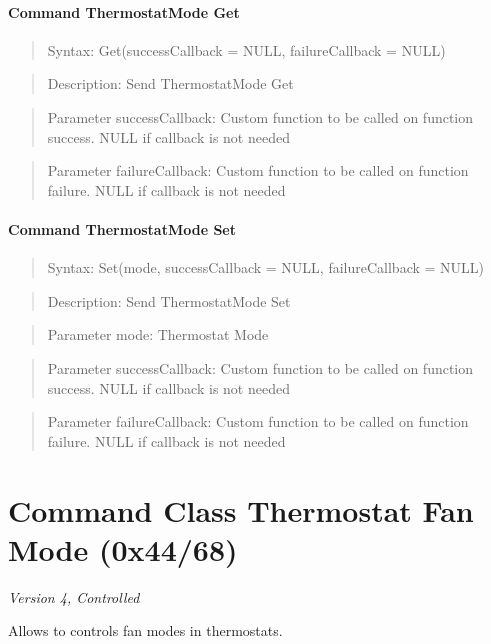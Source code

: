 \paragraph{Command ThermostatMode Get}
\begin{quote}Syntax: Get(successCallback = NULL, failureCallback = NULL)\end{quote}
\begin{quote}Description: Send ThermostatMode Get\end{quote}
\begin{quote}Parameter successCallback: Custom function to be called on function success. NULL if callback is not needed\end{quote}
\begin{quote}Parameter failureCallback: Custom function to be called on function failure. NULL if callback is not needed\end{quote}


\paragraph{Command ThermostatMode Set}
\begin{quote}Syntax: Set(mode, successCallback = NULL, failureCallback = NULL)\end{quote}
\begin{quote}Description: Send ThermostatMode Set\end{quote}
\begin{quote}Parameter mode: Thermostat Mode\end{quote}
\begin{quote}Parameter successCallback: Custom function to be called on function success. NULL if callback is not needed\end{quote}
\begin{quote}Parameter failureCallback: Custom function to be called on function failure. NULL if callback is not needed\end{quote}



\section{Command Class Thermostat Fan Mode (0x44/68)}

\textit{Version 4, Controlled}
\newline

Allows to controls fan modes in thermostats.
\newline

